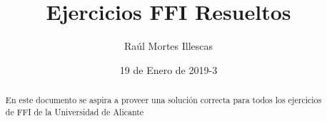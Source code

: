 \documentclass{article}
\title{Ejercicios FFI Resueltos}
\author{Raúl Mortes Illescas}
\date{19 de Enero de 2019-3}
\begin{document}
\begin{titlingpage}
    \maketitle
    \begin{abstract}
        En este documento se aspira a proveer una solución
        correcta para todos los ejercicios de FFI de la
        Universidad de Alicante
    \end{abstract}
\end{titlingpage}

\cleardoublepage

\tableofcontents

\cleardoublepage



\cleardoublepage

\end{document}
